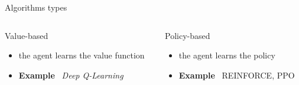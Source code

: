 \documentclass[presentation, 9pt]{beamer}\mode<presentation>{\usetheme{AMSBolognaFC}}
\begin{document}
\begin{frame}{Algorithms types}	
\begin{columns}
	\begin{column}{0.45\textwidth}
		\begin{block}{Value-based}
			\begin{itemize}
				\item the agent learns the value function
				\item \textbf{Example} \faArrowRight \, \emph{Deep Q-Learning}
			\end{itemize}
		\end{block}

		\href{https://www.youtube.com/watch?v=V1eYniJ0Rnk}{}
	\end{column}

	\begin{column}{0.45\textwidth}
		\begin{block}{Policy-based}
			\begin{itemize}
				\item the agent learns the policy 
				\item \textbf{Example} \faArrowRight \, REINFORCE, PPO
			\end{itemize}
		\end{block}
		\centering
		\href{https://openai.com/research/openai-baselines-ppo}{}
	\end{column}
\end{columns}

\end{frame}
\end{document}

